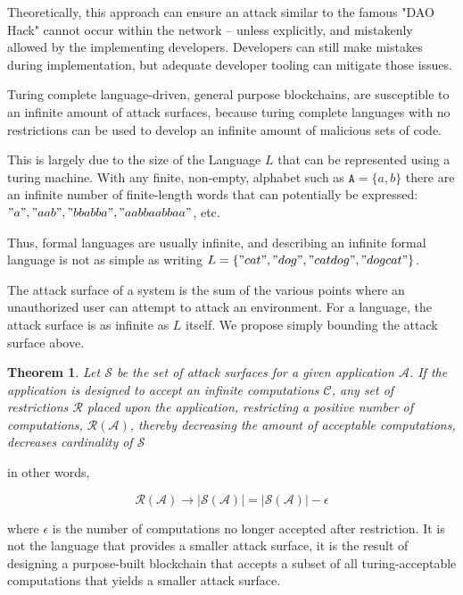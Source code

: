 \documentclass[12pt, titlepage, twocolumn]{report}
\newtheorem{theorem}{Theorem}
\begin{document}
Theoretically, this approach can ensure an attack similar to the famous "DAO Hack" cannot occur within the network -- unless explicitly, and mistakenly allowed by the implementing developers. Developers can still make mistakes during implementation, but adequate developer tooling can mitigate those issues.

Turing complete language-driven, general purpose blockchains, are susceptible to an infinite amount of attack surfaces, because turing complete languages with no restrictions can be used to develop an infinite amount of malicious sets of code. 

This is largely due to the size of the Language \(L\) that can be represented using a turing machine. With any finite, non-empty, alphabet such as \(\texttt{A} = \{a, b\}\) there are an infinite number of finite-length words that can potentially be expressed: \("a", "aab", "bbabba", "aabbaabbaa"\), etc. 

Thus, formal languages are usually infinite, and describing an infinite formal language is not as simple as writing \(L = \{"cat", "dog", "catdog","dogcat"\}\). 

The attack surface of a system is the sum of the various points where an unauthorized user can attempt to attack an environment. For a language, the attack surface is as infinite as \(L\) itself. We propose simply bounding the attack surface above.

\begin{theorem}
	Let  \( \mathcal{S} \) be the set of attack surfaces for a given application \( \mathcal{A} \). If the application is designed to accept an infinite computations \( \mathcal{C} \), any set of restrictions \( \mathcal{R} \) placed upon the application, restricting a positive number of computations, \( \mathcal{R}(\mathcal{A}) \), thereby decreasing the amount of acceptable computations, decreases cardinality of \( \mathcal{S} \)
\end{theorem}

in other words,

\begin{equation}
	\mathcal{R}(\mathcal{A}) \rightarrow \vert\mathcal{S}(\mathcal{A})\vert  = \vert\mathcal{S}(\mathcal{A})\vert - \epsilon	
\end{equation}

where \(\epsilon\) is the number of computations no longer accepted after restriction. It is not the language that provides a smaller attack surface, it is the result of designing a purpose-built blockchain that accepts a subset of all turing-acceptable computations that yields a smaller attack surface.
\end{document}
